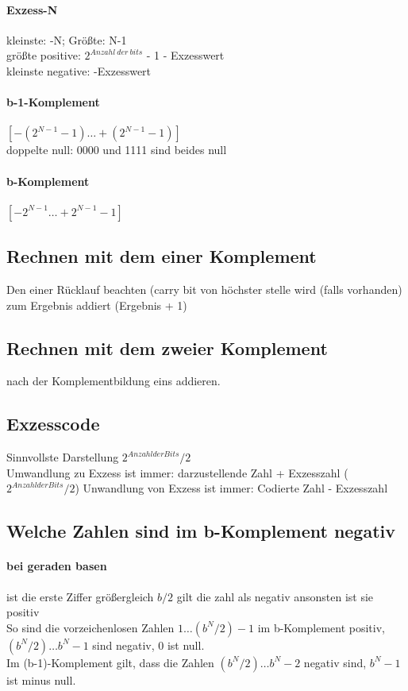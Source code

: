 \documentclass[a4paper]{article}
\begin{document}
		\paragraph{Exzess-N}
		kleinste: -N; Größte: N-1\\
		größte positive: $2^{Anzahl~der~bits}$ - 1 - Exzesswert\\
		kleinste negative: -Exzesswert
		\paragraph{b-1-Komplement}
		$[ -(2^{N-1}-1) … +(2^{N-1}-1)]$\\
		doppelte null: 0000 und 1111 sind beides null
		\paragraph{b-Komplement}
		$[ - 2^{N-1} … +2^{N-1} - 1]$
		
	\subsection{Rechnen mit dem einer Komplement}
		Den einer Rücklauf beachten (carry bit von höchster stelle wird (falls vorhanden) zum Ergebnis addiert (Ergebnis + 1)
	\subsection{Rechnen mit dem zweier Komplement}
		nach der Komplementbildung eins addieren.
	\subsection{Exzesscode}
		Sinnvollste Darstellung $2^{Anzahl der Bits} / 2$\\
		Umwandlung zu Exzess ist immer: darzustellende Zahl + Exzesszahl ($2^{Anzahl der Bits} / 2$)
		Unwandlung von Exzess ist immer: Codierte Zahl - Exzesszahl
		
	\subsection{Welche Zahlen sind im b-Komplement negativ}
		\paragraph{bei geraden basen} ist die erste Ziffer größergleich $ b / 2 $ gilt die zahl als negativ ansonsten ist sie positiv \\
		So sind die vorzeichenlosen Zahlen $1 … (b^N/2)-1$ im b-Komplement positiv, $(b^N/2) … b^N-1$ sind negativ, $0$ ist null.\\
		Im (b-1)-Komplement gilt, dass die Zahlen $(b^N/2) … b^N-2$ negativ sind, $b^N-1$ ist minus null.
\end{document}
